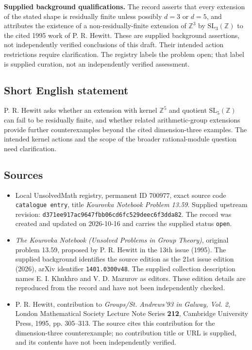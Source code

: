 \documentclass[11pt]{article}
\newcommand{\Z}{\mathbb{Z}}
\begin{document}
\textbf{Supplied background qualifications.} The record asserts that every extension of the stated shape is residually finite unless possibly \(d=3\) or \(d=5\), and attributes the existence of a non-residually-finite extension of \(\Z^3\) by \(\mathrm{SL}_3(\Z)\) to the cited 1995 work of P. R. Hewitt. These are supplied background assertions, not independently verified conclusions of this draft. Their intended action restrictions require clarification. The registry labels the problem open; that label is supplied curation, not an independently verified assessment.
\subsection{Short English statement}
P. R. Hewitt asks whether an extension with kernel \(\Z^5\) and quotient \(\mathrm{SL}_5(\Z)\) can fail to be residually finite, and whether related arithmetic-group extensions provide further counterexamples beyond the cited dimension-three examples. The intended kernel actions and the scope of the broader rational-module question need clarification.
\subsection{Sources}
\begin{itemize}
\item Local UnsolvedMath registry, permanent ID \(700977\), exact source code \texttt{catalogue entry}, title \emph{Kourovka Notebook Problem 13.59}. Supplied upstream revision: \texttt{d371ee917ac9647fbb06cd6fc529deec6f3dda82}. The record was created and updated on 2026-10-16 and carries the supplied status \texttt{open}.
\item \emph{The Kourovka Notebook (Unsolved Problems in Group Theory)}, original problem 13.59, proposed by P. R. Hewitt in the 13th issue (1995). The supplied background identifies the source edition as the 21st issue edition (2026), arXiv identifier \texttt{1401.0300v48}. The supplied collection description names E. I. Khukhro and V. D. Mazurov as editors. These edition details are reproduced from the record and have not been independently checked.
\item P. R. Hewitt, contribution to \emph{Groups/St. Andrews'93 in Galway, Vol. 2}, London Mathematical Society Lecture Note Series \textbf{212}, Cambridge University Press, 1995, pp. 305--313. The source cites this contribution for the dimension-three counterexample; no contribution title or URL is supplied, and its contents have not been independently verified.
\end{itemize}
\end{document}
